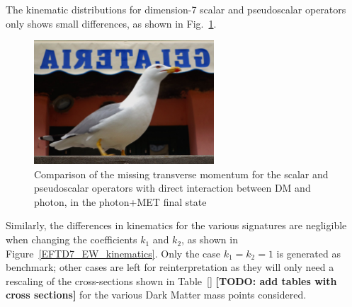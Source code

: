 The kinematic distributions for dimension-7 scalar and pseudoscalar operators
only shows small differences, as shown in Fig.~\ref{fig:EW_EFT5_gamma_MET}.

\begin{figure}
    \includegraphics[width=0.6\textwidth]{figures/llug}
    \caption{Comparison of the missing transverse momentum for the scalar and pseudoscalar
    operators with direct interaction between DM and photon, in the photon+MET final state}
    \label{fig:EW_EFT5_gamma_MET}
\end{figure}

Similarly, the differences in kinematics for the various signatures
are negligible when changing the coefficients $k_1$ and $k_2$, as shown
in Figure~\ref{EFTD7_EW_kinematics}. Only the case $k_1=k_2=1$ is generated as benchmark;
other cases are left for reinterpretation as they will only need a rescaling of the cross-sections
shown in Table~\ref{} \textbf{[TODO: add tables with cross sections]} for the various Dark Matter
mass points considered.

